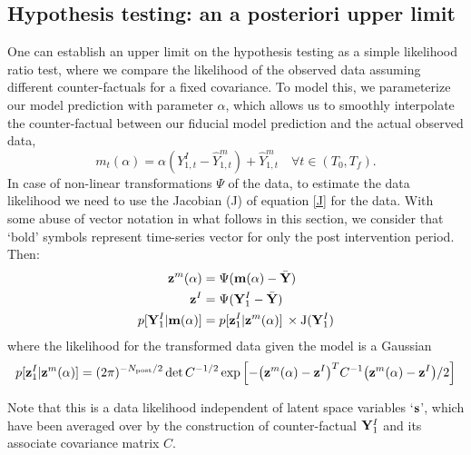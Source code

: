 \documentclass{article}
\def\bm{{\bf m}}
\def\bY{{\bf Y}}
\def\bz{{\bf z}}
\def\bs{{\bf s}}
\newcommand\US[1]{\textcolor{red}{(US: #1)}}
\begin{document}
\subsection{Hypothesis testing: an a posteriori upper limit}
\label{sec:hypothesis1d}
One can establish an upper limit on the hypothesis testing
as a simple likelihood ratio test, where we compare the likelihood of the observed data assuming different counter-factuals for a fixed covariance. To model this, we parameterize our model prediction with parameter $\alpha$, which allows us to smoothly interpolate the counter-factual between our fiducial model prediction and the actual observed data,
\begin{equation}
    m_t(\alpha) = \alpha (Y^I_{1, t} - \hat Y^m_{1, t}) +  \hat Y^m_{1, t}
    \quad \forall  t \in (T_0, T_f).
\end{equation}
In case of non-linear transformations $\Psi$ of the data, to estimate the data likelihood we need to use the Jacobian (J)
of equation \ref{J} for the data. With some abuse of vector notation in what follows in this section, we consider that `bold' symbols represent time-series vector for only the post intervention period. Then:
\textbf{
\begin{align}
    \bz^m(\alpha) &= \Psi(\bm(\alpha) - \bar{\bY})\\
    \bz^I &= \Psi(\bY^I_{1}- \bar{\bY})\\
    p[\bY^I_{1}|\bm(\alpha)] &= p[\bz^I_{1}|\bz^m(\alpha)]\, \times {\rm J}(\bY^I_{1})
    \label{plik}
\end{align}}
where the likelihood for the transformed data given the model is a Gaussian
\begin{equation}
    p[\bz^I_{1}|\bz^m(\alpha)] = (2\pi)^{-N_{\rm post}/2}\det C^{-1/2}\exp\left[-\big(\bz^m(\alpha) - \bz^I\big)^T C^{-1} \big(\bz^m(\alpha) - \bz^I\big)/2\right] 
    \label{plikg}
\end{equation}

Note that this is a data likelihood independent of latent space variables `$\bs$', which 
have been averaged over by the construction of counter-factual $\bY^I_{1}$ and its 
associate covariance matrix $C$. 
\end{document}
